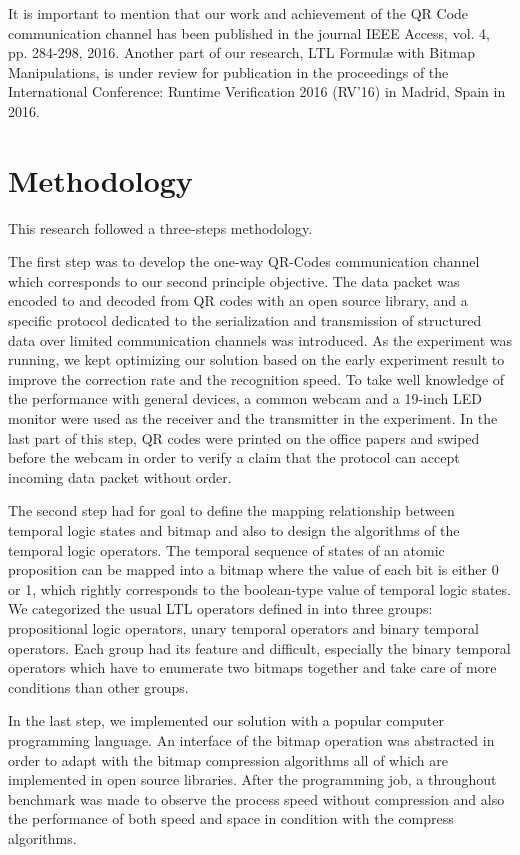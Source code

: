 It is important to mention that our work and achievement of the QR Code communication channel has been published in the journal IEEE Access, vol. 4, pp. 284-298, 2016. Another part of our research, LTL Formul\ae{} with Bitmap Manipulations, is under review for publication in the proceedings of the International Conference: Runtime Verification 2016 (RV'16) in Madrid, Spain in 2016.

\section{Methodology}

This research followed a three-steps methodology.

The first step was to develop the one-way QR-Codes communication channel which corresponds to our second principle objective. The data packet was encoded to and decoded from QR codes with an open source library, and a specific protocol dedicated to the serialization and transmission of structured data over limited communication channels was introduced. As the experiment was running, we kept optimizing our solution based on the early experiment result to improve the correction rate and the recognition speed. To take well knowledge of the performance with general devices, a common webcam and a 19-inch LED monitor were used as the receiver and the transmitter in the experiment. In the last part of this step, QR codes were printed on the office papers and swiped before the webcam in order to verify a claim that the protocol can accept incoming data packet without order.

The second step had for goal to define the mapping relationship between temporal logic states and bitmap and also to design the algorithms of the temporal logic operators. The temporal sequence of states of an atomic proposition can be mapped into a bitmap where the value of each bit is either 0 or 1, which rightly corresponds to the boolean-type value of temporal logic states. We categorized the usual LTL operators defined in \cite{huth2004} into three groups: propositional logic operators, unary temporal operators and binary temporal operators. Each group had its feature and difficult, especially the binary temporal operators which have to enumerate two bitmaps together and take care of more conditions than other groups.

In the last step, we implemented our solution with a popular computer programming language. An interface of the bitmap operation was abstracted in order to adapt with the bitmap compression algorithms all of which are implemented in open source libraries. After the programming job, a throughout benchmark was made to observe the process speed without compression and also the performance of both speed and space in condition with the compress algorithms.

